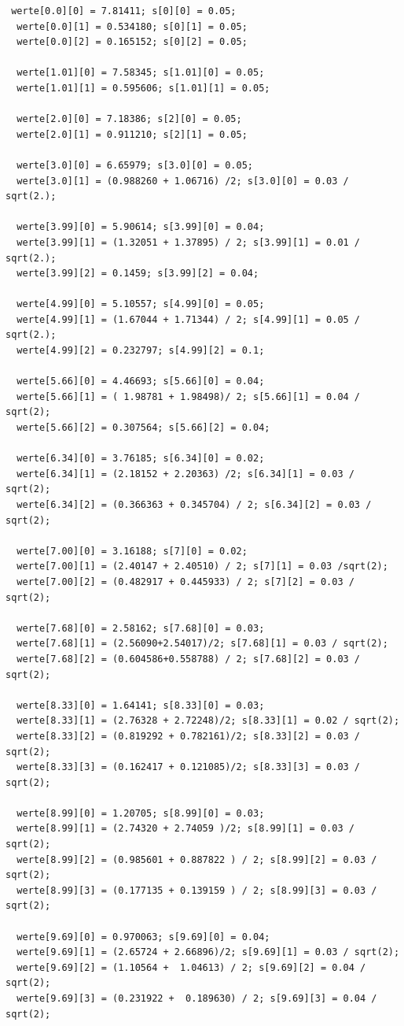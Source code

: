 \begin{verbatim}
 werte[0.0][0] = 7.81411; s[0][0] = 0.05;
  werte[0.0][1] = 0.534180; s[0][1] = 0.05;
  werte[0.0][2] = 0.165152; s[0][2] = 0.05;
  
  werte[1.01][0] = 7.58345; s[1.01][0] = 0.05;
  werte[1.01][1] = 0.595606; s[1.01][1] = 0.05;

  werte[2.0][0] = 7.18386; s[2][0] = 0.05;
  werte[2.0][1] = 0.911210; s[2][1] = 0.05;
  
  werte[3.0][0] = 6.65979; s[3.0][0] = 0.05;
  werte[3.0][1] = (0.988260 + 1.06716) /2; s[3.0][0] = 0.03 / sqrt(2.);
  
  werte[3.99][0] = 5.90614; s[3.99][0] = 0.04;
  werte[3.99][1] = (1.32051 + 1.37895) / 2; s[3.99][1] = 0.01 / sqrt(2.);
  werte[3.99][2] = 0.1459; s[3.99][2] = 0.04;
  
  werte[4.99][0] = 5.10557; s[4.99][0] = 0.05;
  werte[4.99][1] = (1.67044 + 1.71344) / 2; s[4.99][1] = 0.05 / sqrt(2.);
  werte[4.99][2] = 0.232797; s[4.99][2] = 0.1;
  
  werte[5.66][0] = 4.46693; s[5.66][0] = 0.04;
  werte[5.66][1] = ( 1.98781 + 1.98498)/ 2; s[5.66][1] = 0.04 / sqrt(2);
  werte[5.66][2] = 0.307564; s[5.66][2] = 0.04;
  
  werte[6.34][0] = 3.76185; s[6.34][0] = 0.02;
  werte[6.34][1] = (2.18152 + 2.20363) /2; s[6.34][1] = 0.03 / sqrt(2);
  werte[6.34][2] = (0.366363 + 0.345704) / 2; s[6.34][2] = 0.03 / sqrt(2);
  
  werte[7.00][0] = 3.16188; s[7][0] = 0.02;
  werte[7.00][1] = (2.40147 + 2.40510) / 2; s[7][1] = 0.03 /sqrt(2);
  werte[7.00][2] = (0.482917 + 0.445933) / 2; s[7][2] = 0.03 / sqrt(2);
  
  werte[7.68][0] = 2.58162; s[7.68][0] = 0.03;
  werte[7.68][1] = (2.56090+2.54017)/2; s[7.68][1] = 0.03 / sqrt(2);
  werte[7.68][2] = (0.604586+0.558788) / 2; s[7.68][2] = 0.03 / sqrt(2);
  
  werte[8.33][0] = 1.64141; s[8.33][0] = 0.03;
  werte[8.33][1] = (2.76328 + 2.72248)/2; s[8.33][1] = 0.02 / sqrt(2);
  werte[8.33][2] = (0.819292 + 0.782161)/2; s[8.33][2] = 0.03 / sqrt(2);
  werte[8.33][3] = (0.162417 + 0.121085)/2; s[8.33][3] = 0.03 / sqrt(2);
  
  werte[8.99][0] = 1.20705; s[8.99][0] = 0.03;
  werte[8.99][1] = (2.74320 + 2.74059 )/2; s[8.99][1] = 0.03 / sqrt(2);
  werte[8.99][2] = (0.985601 + 0.887822 ) / 2; s[8.99][2] = 0.03 / sqrt(2);
  werte[8.99][3] = (0.177135 + 0.139159 ) / 2; s[8.99][3] = 0.03 / sqrt(2);
  
  werte[9.69][0] = 0.970063; s[9.69][0] = 0.04;
  werte[9.69][1] = (2.65724 + 2.66896)/2; s[9.69][1] = 0.03 / sqrt(2);
  werte[9.69][2] = (1.10564 +  1.04613) / 2; s[9.69][2] = 0.04 / sqrt(2);
  werte[9.69][3] = (0.231922 +  0.189630) / 2; s[9.69][3] = 0.04 / sqrt(2);
\end{verbatim}
 


